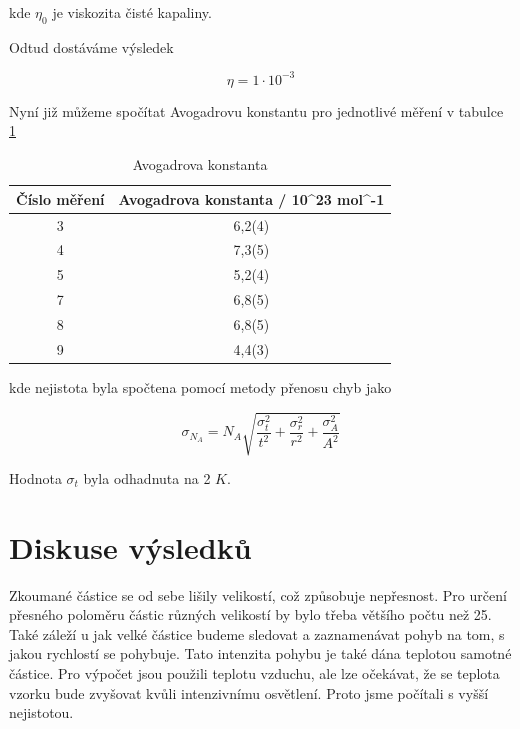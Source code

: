 kde \(\eta_0\) je viskozita čisté kapaliny.

Odtud dostáváme výsledek

\begin{equation}
    \nonumber
    \eta = 1 \cdot 10^{-3}
\end{equation}

Nyní již můžeme spočítat Avogadrovu konstantu pro jednotlivé měření v tabulce \ref{tab:avogadrova-konstanta}

\begin{table}[h]
\centering
\begin{tabular}{|c|c|}
\hline
Číslo měření & Avogadrova konstanta / 10^{23} \; mol^{-1} \\ \hline
3            & 6,2(4)                   \\
4            & 7,3(5)                                            \\
5            & 5,2(4)                                            \\
7            & 6,8(5)                                            \\
8            & 6,8(5)                                            \\
9            & 4,4(3)                                            \\ \hline
\end{tabular}
\caption{Avogadrova konstanta}
\label{tab:avogadrova-konstanta}
\end{table}

kde nejistota byla spočtena pomocí metody přenosu chyb jako

\begin{equation}
    \sigma_{N_A} = N_A \sqrt{\frac{\sigma^2_t}{t^2}+\frac{\sigma^2_r}{r^2}+\frac{\sigma^2_A}{A^2}}
\end{equation}

Hodnota \(\sigma_t\) byla odhadnuta na 2 $K$.

\section{Diskuse výsledků}

Zkoumané částice se od sebe lišily velikostí, což způsobuje nepřesnost. Pro určení přesného poloměru částic různých velikostí by bylo třeba většího počtu než 25. Také záleží u jak velké částice budeme sledovat a zaznamenávat pohyb na tom, s jakou rychlostí se pohybuje. Tato intenzita pohybu je také dána teplotou samotné částice. Pro výpočet jsou použili teplotu vzduchu, ale lze očekávat, že se teplota vzorku bude zvyšovat kvůli intenzivnímu osvětlení. Proto jsme počítali s vyšší nejistotou.

